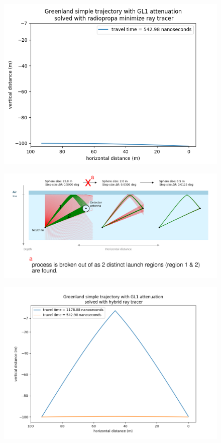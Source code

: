 \documentclass{beamer}
\begin{document}
\begin{frame}
	\begin{figure}
		\includegraphics[width=\textwidth]{figures/minimize.png}
	\end{figure}
\end{frame}
\begin{frame}
	\begin{figure}
		\includegraphics[width=\textwidth]{figures/explanation.png}
	\end{figure}
\end{frame}
\begin{frame}
	\begin{figure}
		\includegraphics[width=\textwidth]{figures/hybrid.png}
	\end{figure}
\end{frame}
\end{document}
